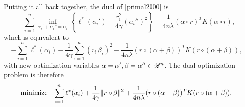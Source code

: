 \documentclass{article}
\newcommand{\sumi}{\sum_{i=1}^n}
\begin{document}
Putting it all back together, the dual of \eqref{primal2000} is
\begin{equation}
  -\sumi \inf_{\alpha_i'+\alpha_i''=\alpha_i}\,\left\{\ell^*(\alpha_i') + \frac{r_i^2}{4\gamma}(\alpha_i'')^2\right\}  - \frac{1}{4n\lambda} (\alpha \circ r)^TK(\alpha \circ r),
\end{equation}
which is equivalent to
\begin{equation}
  -\sumi \ell^*(\alpha_i) - \frac{1}{4\gamma}\sumi (r_i\,\beta_i)^2 - \frac{1}{4n\lambda}(r \circ (\alpha+\beta))^TK(r \circ (\alpha+\beta)),
\end{equation}
with new optimization variables $\alpha=\alpha',\beta=\alpha''\in\mathscr{R}^n$. The dual optimization problem is
therefore
\begin{equation}
  \minimizeEquation{\sumi \ell^*(\alpha_i) + \frac{1}{4\gamma}\|r\circ\beta\|^2 + \frac{1}{4n\lambda}(r \circ (\alpha+\beta))^TK(r \circ (\alpha+\beta))}.
\end{equation}









\end{document}
